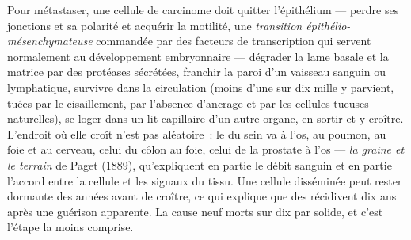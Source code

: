 \begin{definition}\label{def:b3:cancer-biology:metastasis}
Pour métastaser, une cellule de carcinome doit quitter l'épithélium ---
perdre ses jonctions et sa polarité et acquérir la motilité, une
\emph{transition épithélio-mésenchymateuse} commandée par des facteurs
de transcription qui servent normalement au développement embryonnaire
--- dégrader la lame basale et la matrice par des protéases sécrétées,
franchir la paroi d'un vaisseau sanguin ou lymphatique, survivre dans
la circulation (moins d'une sur dix mille y parvient, tuées par le
cisaillement, par l'absence d'ancrage et par les cellules tueuses
naturelles), se loger dans un lit capillaire d'un autre organe, en
sortir et y croître. L'endroit où elle croît n'est pas aléatoire~: le
 du sein va à l'os, au poumon, au foie et au cerveau, celui du
côlon au foie, celui de la prostate à l'os --- \emph{la graine et le
terrain} de Paget (1889), qu'expliquent en partie le débit sanguin et
en partie l'accord entre la cellule et les signaux du tissu. Une
cellule disséminée peut rester dormante des années avant de croître, ce
qui explique que des  récidivent dix ans après une guérison
apparente. La  cause neuf morts sur dix par  solide, et
c'est l'étape la moins comprise.
\end{definition}

